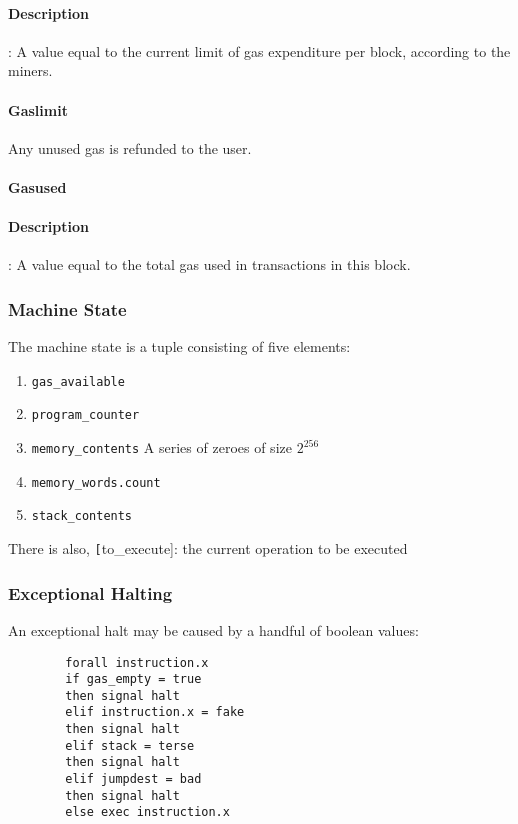 \documentclass[10pt,a4paper,leqno,bibliography=totoc]{scrartcl}
\newenvironment{alphafootnotes}
{\par\edef\savedfootnotenumber{\number\value{footnote}}
\renewcommand{\thefootnote}{\alph{footnote}}
\setcounter{footnote}{0}}
{\par\setcounter{footnote}{\savedfootnotenumber}}
\begin{document}
\begin{alphafootnotes}
\begin{multicols*}{2}
					\paragraph{Description}: A value equal to the current limit of gas expenditure per block, according to the miners. 
				\paragraph{Gaslimit}
					Any unused gas is refunded to the user.

				\paragraph{Gasused}
		\paragraph{Description}: A value equal to the total gas used in transactions in this block. 

			\subsubsection{Machine State}
			The machine state is a tuple consisting of five elements:
		
		\begin{enumerate}
			\item \texttt{gas\_available}
			\item \texttt{program\_counter}
			\item \texttt{memory\_contents} A series of zeroes of size $2^{256}$
			\item \texttt{memory\_words.count}
			\item \texttt{stack\_contents}
		\end{enumerate}
		
		There is also, \texttt[to\_execute]: the current operation to be executed
		
		\subsubsection{Exceptional Halting}
		An exceptional halt may be caused by a handful of boolean values:
		
		\begin{verbatim}
		forall instruction.x
		if gas_empty = true
		then signal halt
		elif instruction.x = fake
		then signal halt
		elif stack = terse
		then signal halt
		elif jumpdest = bad
		then signal halt
		else exec instruction.x
		

\end{verbatim}
\end{multicols*}
\end{alphafootnotes}
\end{document}
